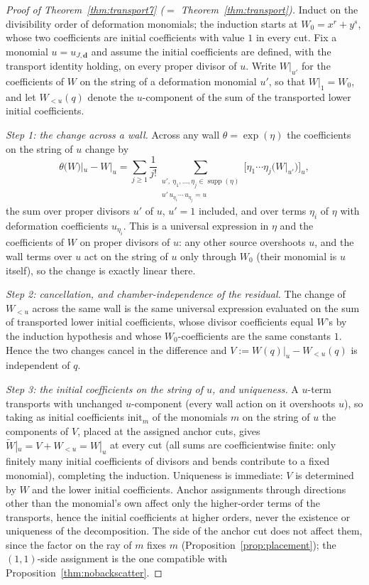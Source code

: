 \documentclass[11pt]{amsart}
\theoremstyle{definition}
\theoremstyle{remark}
\begin{document}
\begin{proof}[Proof of Theorem~\ref{thm:transport7} ($=$ Theorem~\ref{thm:transport})]
Induct on the divisibility order of deformation monomials; the induction
starts at $W_{0}=x^{r}+y^{s}$, whose two coefficients are initial coefficients
with value $1$ in every cut. Fix a monomial $u=u_{J,\mathbf d}$ and assume the
initial coefficients are defined,
with the transport identity holding, on every proper divisor of $u$.  Write
$W|_{u'}$ for the coefficients of $W$ on the string of a deformation monomial
$u'$, so that $W|_1=W_0$, and let
$W_{<u}(q)$ denote the $u$-component of the sum of the transported lower
initial coefficients.

\emph{Step 1: the change across a wall.}
Across any wall $\theta=\exp(\eta)$ the coefficients on the string of $u$
change by
\[
\theta\bigl(W\bigr)|_{u}-W|_{u}
=\sum_{j\ge1}\frac1{j!}
\sum_{\substack{u',\ \eta_{1},\dots,\eta_{j}\in\operatorname{supp}(\eta)\\
u'\,u_{\eta_{1}}\cdots\,u_{\eta_{j}}=u}}
\bigl[\eta_{1}\cdots \eta_{j}\bigl(W|_{u'}\bigr)\bigr]_{u},
\]
the sum over proper divisors $u'$ of $u$, $u'=1$ included, and over terms
$\eta_i$ of $\eta$ with deformation coefficients $u_{\eta_i}$.  This is a
universal expression in $\eta$ and the coefficients of $W$ on proper
divisors of $u$: any other source overshoots $u$, and the wall terms over $u$
act on the string of $u$ only through $W_{0}$ (their monomial is $u$ itself),
so the change is exactly linear there.

\emph{Step 2: cancellation, and chamber-independence of the residual.}
The change of $W_{<u}$ across the same wall is the same universal expression
evaluated on the sum of transported lower initial coefficients, whose divisor
coefficients equal
$W$'s by the induction hypothesis and whose $W_{0}$-coefficients are the same
constants $1$. Hence the two changes cancel in the difference and
$V:=W(q)|_{u}-W_{<u}(q)$ is independent of $q$.

\emph{Step 3: the initial coefficients on the string of $u$, and uniqueness.}
A $u$-term transports with unchanged
$u$-component (every wall action on it overshoots $u$), so taking as initial
coefficients $\mathrm{init}_m$ of the monomials $m$ on the string of $u$ the
components of $V$, placed at the assigned anchor cuts, gives
$\widetilde W|_{u}=V+W_{<u}=W|_{u}$ at every cut (all sums are coefficientwise finite: only
finitely many initial coefficients of divisors and bends contribute to
a fixed monomial),
completing the induction. Uniqueness is
immediate: $V$ is determined by $W$ and the lower initial coefficients. Anchor
assignments through directions other than the monomial's own affect only the
higher-order terms of the transports, hence the initial coefficients at higher
orders, never the existence or uniqueness of the decomposition.  The side of
the anchor cut does not affect them, since the factor on the ray of $m$ fixes
$m$ (Proposition~\ref{prop:placement}); the $(1,1)$-side assignment is the one
compatible with Proposition~\ref{thm:nobackscatter}.
\end{proof}
\end{document}
